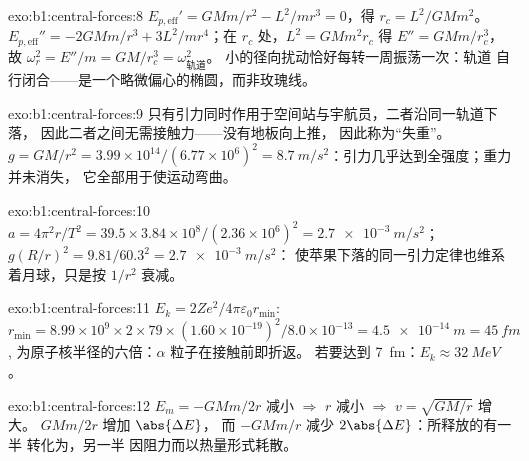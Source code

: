 \begin{solution}{exo:b1:central-forces:8}
$E_{p,\mathrm{eff}}' = GMm/r^2 - L^2/mr^3 = 0$，得 $r_c = L^2/GMm^2$。
$E_{p,\mathrm{eff}}'' = -2GMm/r^3 + 3L^2/mr^4$；在 $r_c$ 处，$L^2 = GMm^2r_c$
得 $E'' = GMm/r_c^3$，故 $\omega_r^2 = E''/m = GM/r_c^3 = \omega_{\text{轨道}}^2$。
小的径向扰动恰好每转一周振荡一次：轨道
自行闭合——是一个略微偏心的椭圆，而非玫瑰线。
\end{solution}

\begin{solution}{exo:b1:central-forces:9}
只有引力同时作用于空间站与宇航员，二者沿同一轨道下落，
因此二者之间无需接触力——没有地板向上推，
因此称为“失重”。$g = GM/r^2 = 3.99\times10^{14}/(6.77\times10^6)^2
= \qty{8.7}{m/s^2}$：引力几乎达到全强度；重力并未消失，
它全部用于使运动弯曲。
\end{solution}

\begin{solution}{exo:b1:central-forces:10}
$a = 4\pi^2r/T^2 = 39.5 \times 3.84\times10^8/(2.36\times10^6)^2 =
\qty{2.7e-3}{m/s^2}$；$g(R/r)^2 = 9.81/60.3^2 = \qty{2.7e-3}{m/s^2}$：
使苹果下落的同一引力定律也维系着月球，只是按 $1/r^2$ 衰减。
\end{solution}

\begin{solution}{exo:b1:central-forces:11}
$E_k = 2Ze^2/4\pi\varepsilon_0r_{\min}$: $r_{\min} = 8.99\times10^9 \times 2 \times 79
\times (1.60\times10^{-19})^2/8.0\times10^{-13} = \qty{4.5e-14}{m} = \qty{45}{fm}$,
为原子核半径的六倍：$\alpha$ 粒子在接触前即折返。
若要达到 \qty{7}{fm}：$E_k \approx \qty{32}{MeV}$。
\end{solution}

\begin{solution}{exo:b1:central-forces:12}
$E_m = -GMm/2r$ 减小 $\Rightarrow$ $r$ 减小 $\Rightarrow$ $v =
\sqrt{GM/r}$ 增大。 $GMm/2r$ 增加 $\abs{\Delta E}$，
而 $-GMm/r$ 减少 $2\abs{\Delta E}$：所释放的有一半
转化为，另一半
因阻力而以热量形式耗散。
\end{solution}

